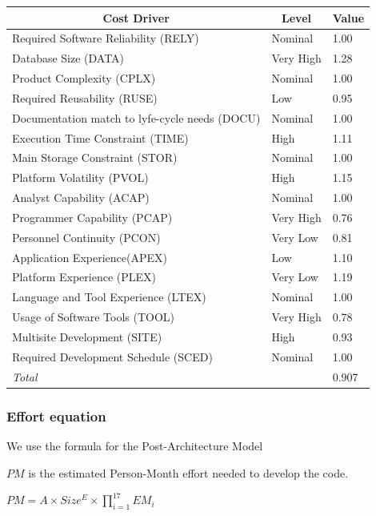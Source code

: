 \documentclass[english]{article}
\begin{document}
\begin{center}
	\begin{tabular}{|p{8cm}|p{2cm}|p{1cm}|}
		\hline
		\multicolumn{1}{|c|}{\textbf{Cost Driver}} & \multicolumn{1}{c|}{\textbf{Level}} & \multicolumn{1}{c|}{\textbf{Value}} \\
		\hline
		Required Software Reliability (RELY) & Nominal & 1.00 \\
		Database Size (DATA) & Very High & 1.28 \\
		Product Complexity (CPLX) & Nominal & 1.00 \\
		Required Reusability (RUSE) & Low & 0.95 \\
		Documentation match to lyfe-cycle needs (DOCU) & Nominal & 1.00 \\
		Execution Time Constraint (TIME) & High & 1.11 \\
		Main Storage Constraint (STOR) & Nominal & 1.00 \\
		Platform Volatility (PVOL) & High & 1.15 \\
		Analyst Capability (ACAP) & Nominal & 1.00 \\
		Programmer Capability (PCAP) & Very High & 0.76 \\
		Personnel Continuity (PCON) & Very Low & 0.81 \\
		Application Experience(APEX) & Low & 1.10 \\
		Platform Experience (PLEX) & Very Low & 1.19 \\
		Language and Tool Experience (LTEX) & Nominal & 1.00 \\
		Usage of Software Tools (TOOL) & Very High & 0.78 \\
		Multisite Development (SITE) & High & 0.93 \\
		Required Development Schedule (SCED) & Nominal & 1.00 \\
		\hline
		\multicolumn{2}{|l|}{\textit{Total}} & 0.907 \\
		\hline
	\end{tabular}
\end{center}


\subsubsection{Effort equation}

We use the formula for the Post-Architecture Model

$PM$ is the estimated Person-Month effort needed to develop the code.


\begin{center}
$ PM = A \times Size^E \times \prod_{i=1}^{17} EM_i $
\end{center}
\end{document}
